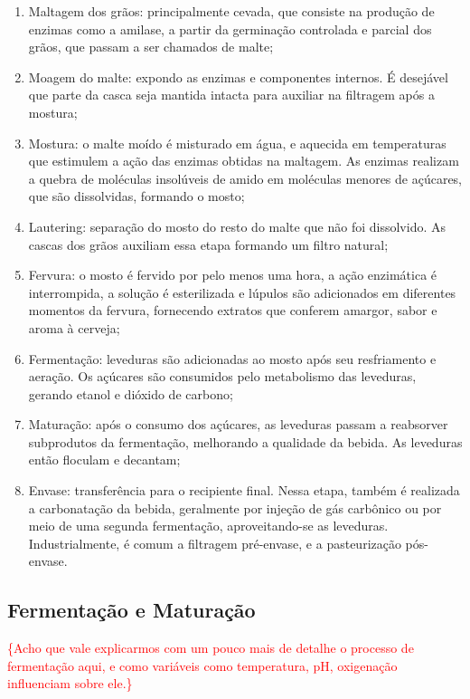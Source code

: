 \begin{enumerate}
    \item Maltagem dos grãos: principalmente cevada, que consiste na produção de
enzimas como a amilase, a partir da germinação controlada e parcial dos
grãos, que passam a ser chamados de malte;
    \item Moagem do malte: expondo as enzimas e componentes internos. É desejável
que parte da casca seja mantida intacta para auxiliar na filtragem após a
mostura;
    \item Mostura: o malte moído é misturado em água, e aquecida em temperaturas
que estimulem a ação das enzimas obtidas na maltagem. As enzimas
realizam a quebra de moléculas insolúveis de amido em moléculas menores
de açúcares, que são dissolvidas, formando o mosto;
    \item Lautering: separação do mosto do resto do malte que não foi dissolvido. As
cascas dos grãos auxiliam essa etapa formando um filtro natural;
    \item Fervura: o mosto é fervido por pelo menos uma hora, a ação enzimática é
interrompida, a solução é esterilizada e lúpulos são adicionados em diferentes
momentos da fervura, fornecendo extratos que conferem amargor, sabor e
aroma à cerveja;
    \item Fermentação: leveduras são adicionadas ao mosto após seu resfriamento e
aeração. Os açúcares são consumidos pelo metabolismo das leveduras,
gerando etanol e dióxido de carbono;
    \item Maturação: após o consumo dos açúcares, as leveduras passam a reabsorver
subprodutos da fermentação, melhorando a qualidade da bebida. As
leveduras então floculam e decantam;
    \item Envase: transferência para o recipiente final. Nessa etapa, também é
realizada a carbonatação da bebida, geralmente por injeção de gás carbônico
ou por meio de uma segunda fermentação, aproveitando-se as leveduras.
Industrialmente, é comum a filtragem pré-envase, e a pasteurização pós-
envase.
\end{enumerate}

\subsection{Fermentação e Maturação}

\textcolor{red}{\{Acho que vale explicarmos com um pouco mais de detalhe o processo de fermentação aqui, e como variáveis como temperatura, pH, oxigenação influenciam sobre ele.\}}

